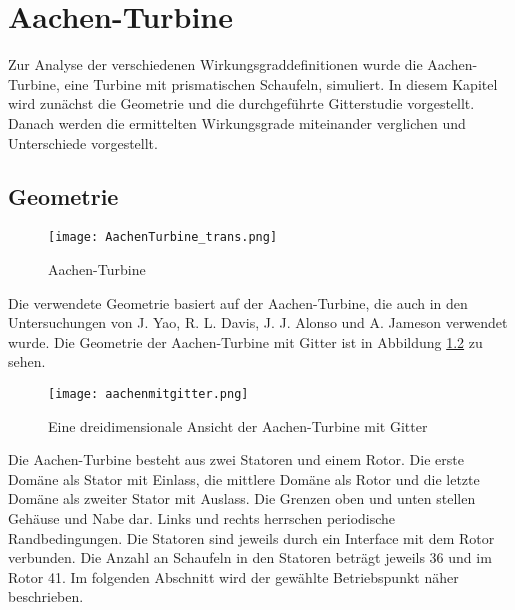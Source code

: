 \chapter{Aachen-Turbine}
\label{cha:aachen}
Zur Analyse der verschiedenen Wirkungsgraddefinitionen wurde die Aachen-Turbine, eine Turbine mit prismatischen Schaufeln, simuliert. In diesem Kapitel wird zunächst die Geometrie und die durchgeführte Gitterstudie vorgestellt. Danach werden die ermittelten Wirkungsgrade miteinander verglichen und Unterschiede vorgestellt.
\section{Geometrie}
\label{sec:aachengeo}
  \begin{figure}[htbp]
	\centering
	\texttt{[image: AachenTurbine\_trans.png]}
	\caption{Aachen-Turbine} \label{fig:imgAachenTurbine}
\end{figure} 
Die verwendete Geometrie basiert auf der Aachen-Turbine, die auch in den Untersuchungen von J. Yao, R. L. Davis, J. J. Alonso und A. Jameson\cite{ufi2001YaoDavis} 
verwendet wurde. Die Geometrie der Aachen-Turbine mit Gitter ist in Abbildung \ref{fig:aachengebiet} zu sehen. 
\begin{figure}[htbp]
	\centering
	\texttt{[image: aachenmitgitter.png]}
	\caption{Eine dreidimensionale Ansicht der Aachen-Turbine mit Gitter}
	\label{fig:aachengebiet}
\end{figure}
Die Aachen-Turbine besteht aus zwei Statoren und einem Rotor. Die erste Domäne als Stator mit Einlass, die mittlere Domäne als Rotor und die letzte Domäne als zweiter Stator mit Auslass. Die Grenzen oben und unten stellen Gehäuse und Nabe dar. Links und rechts herrschen periodische Randbedingungen. Die Statoren sind jeweils durch ein Interface mit dem Rotor verbunden. Die Anzahl an Schaufeln in den Statoren beträgt jeweils 36 und im Rotor 41.
\newline
Im folgenden Abschnitt wird der gewählte Betriebspunkt näher beschrieben.
